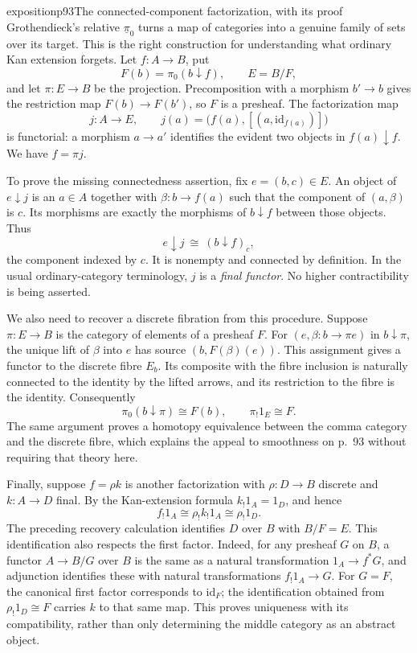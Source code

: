 \begin{dcomment}{exposition}{p93}{The connected-component factorization, with its proof}
Grothendieck's relative $\underline\pi_0$ turns a map of categories into a genuine family of sets over its target. This is the right construction for understanding what ordinary Kan extension forgets. Let $f:A\to B$, put
\[
F(b)=\pi_0(b\downarrow f),\qquad E=B/F,
\]
and let $\pi:E\to B$ be the projection. Precomposition with a morphism $b'\to b$ gives the restriction map $F(b)\to F(b')$, so $F$ is a presheaf. The factorization map
\[
j:A\longrightarrow E,\qquad
j(a)=\bigl(f(a),[(a,\mathrm{id}_{f(a)})]\bigr)
\]
is functorial: a morphism $a\to a'$ identifies the evident two objects in $f(a)\downarrow f$. We have $f=\pi j$.

To prove the missing connectedness assertion, fix $e=(b,c)\in E$. An object of $e\downarrow j$ is an $a\in A$ together with $\beta:b\to f(a)$ such that the component of $(a,\beta)$ is $c$. Its morphisms are exactly the morphisms of $b\downarrow f$ between those objects. Thus
\[
e\downarrow j\ \cong\ (b\downarrow f)_c,
\]
the component indexed by $c$. It is nonempty and connected by definition. In the usual ordinary-category terminology, $j$ is a \emph{final functor}. No higher contractibility is being asserted.

We also need to recover a discrete fibration from this procedure. Suppose $\pi:E\to B$ is the category of elements of a presheaf $F$. For $(e,\beta:b\to\pi e)$ in $b\downarrow\pi$, the unique lift of $\beta$ into $e$ has source $(b,F(\beta)(e))$. This assignment gives a functor to the discrete fibre $E_b$. Its composite with the fibre inclusion is naturally connected to the identity by the lifted arrows, and its restriction to the fibre is the identity. Consequently
\[
\pi_0(b\downarrow\pi)\cong F(b),\qquad
\pi_!1_E\cong F.
\]
The same argument proves a homotopy equivalence between the comma category and the discrete fibre, which explains the appeal to smoothness on p.~93 without requiring that theory here.

Finally, suppose $f=\rho k$ is another factorization with $\rho:D\to B$ discrete and $k:A\to D$ final. By the Kan-extension formula $k_!1_A=1_D$, and hence
\[
f_!1_A\cong\rho_!k_!1_A\cong\rho_!1_D.
\]
The preceding recovery calculation identifies $D$ over $B$ with $B/F=E$. This identification also respects the first factor. Indeed, for any presheaf $G$ on $B$, a functor $A\to B/G$ over $B$ is the same as a natural transformation $1_A\to f^*G$, and adjunction identifies these with natural transformations $f_!1_A\to G$. For $G=F$, the canonical first factor corresponds to $\mathrm{id}_F$; the identification obtained from $\rho_!1_D\cong F$ carries $k$ to that same map. This proves uniqueness with its compatibility, rather than only determining the middle category as an abstract object.


\end{dcomment}
